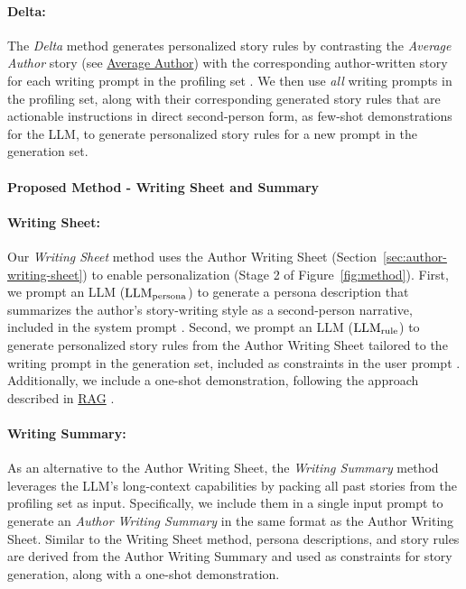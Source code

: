 \paragraph{Delta:}
\hypertarget{sec:delta}{}
The \emph{Delta} method generates personalized story rules by contrasting the \emph{Average Author} story (see \hyperlink{sec:avg-author}{Average Author}) with the corresponding author-written story for each writing prompt in the profiling set \citep{shashidhar-etal-2024-unsupervised}. We then use \emph{all} writing prompts in the profiling set, along with their corresponding generated story rules that are actionable instructions in direct second-person form, as few-shot demonstrations for the LLM, to generate personalized story rules for a new prompt in the generation set. 


\paragraph{Proposed Method - Writing Sheet and Summary}

\paragraph{Writing Sheet:}
\hypertarget{sec:writing-sheet}{}
Our \emph{Writing Sheet} method uses the Author Writing Sheet (Section~\ref{sec:author-writing-sheet}) to enable personalization (Stage 2 of Figure~\ref{fig:method}). First, we prompt an LLM (\(\text{LLM\textsubscript{persona}}\)) to generate a persona description that summarizes the author's story-writing style as a second-person narrative, included in the system prompt \citep{wang-etal-2024-rolellm, jiang2024evaluating}. Second, we prompt an LLM (\(\text{LLM\textsubscript{rule}}\)) to generate personalized story rules from the Author Writing Sheet tailored to the writing prompt in the generation set, included as constraints in the user prompt \citep{pham-etal-2024-suri}. Additionally, we include a one-shot demonstration, following the approach described in \hyperlink{sec:rag}{RAG} \citep{richardson2023integrating}. 

\paragraph{Writing Summary:}
\hypertarget{sec:writing-summary}{}
As an alternative to the Author Writing Sheet, the \emph{Writing Summary} method leverages the LLM's long-context capabilities \citep{ding2023longnet} by packing all past stories from the profiling set as input. Specifically, we include them in a single input prompt to generate an \emph{Author Writing Summary} in the same format as the Author Writing Sheet. Similar to the Writing Sheet method, persona descriptions, and story rules are derived from the Author Writing Summary and used as constraints for story generation, along with a one-shot demonstration. 
